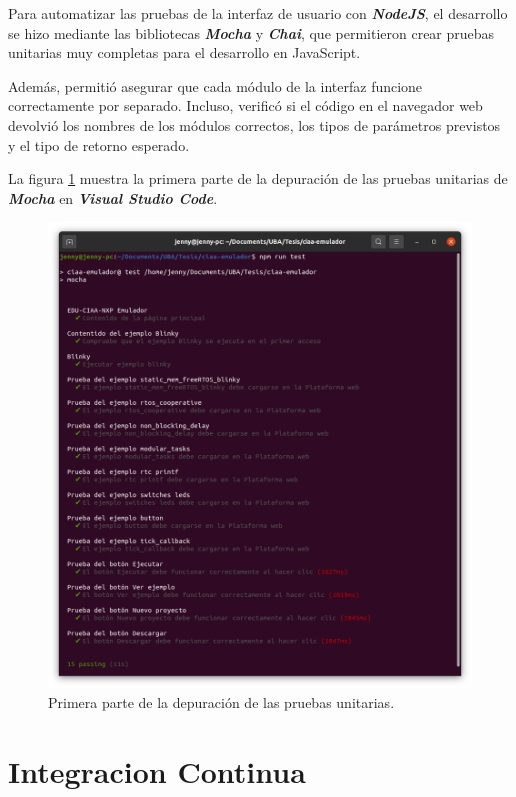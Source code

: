 Para automatizar las pruebas de la interfaz de usuario con \textit{\textbf{NodeJS}}, el desarrollo se hizo mediante las bibliotecas \textit{\textbf{Mocha}} y \textit{\textbf{Chai}}, que permitieron crear pruebas unitarias muy completas para el desarrollo en JavaScript.

Además, permitió asegurar que cada módulo de la interfaz funcione correctamente por separado. Incluso, verificó si el código en el navegador web devolvió los nombres de los módulos correctos, los tipos de parámetros previstos y el tipo de retorno esperado.


La figura \ref{fig:TestVS1} muestra la primera parte de la depuración de las pruebas unitarias de \textit{\textbf{Mocha}}  en \textit{\textbf{Visual Studio Code}}.

\begin{figure}[ht]
	\centering
	\includegraphics[scale=.29]{./Figures/TestInterfaz.png}
	\caption{Primera parte de la depuración de las pruebas unitarias.}
	\label{fig:TestVS1}
\end{figure}

\section{Integracion Continua}
\label{sec:Integracion Continua}

